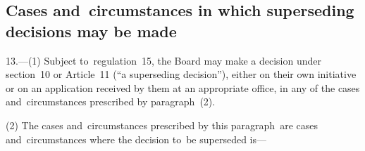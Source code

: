 \documentclass[12pt,a4paper]{article}
\begin{document}
\renewcommand\parthead{--- Part III}

\subsection[13. Cases and~circumstances in which superseding decisions may be made]{Cases and~circumstances in which superseding decisions may be made}

13.---(1)  Subject to~regulation~15, the Board may make a decision under section~10 or Article~11 (“a superseding decision”), either on their own initiative or on an application received by them at an appropriate office, in any of the cases and~circumstances prescribed by paragraph~(2).

(2) The cases and~circumstances prescribed by this paragraph~are cases and~circumstances where the decision to~be superseded is—
\end{document}
